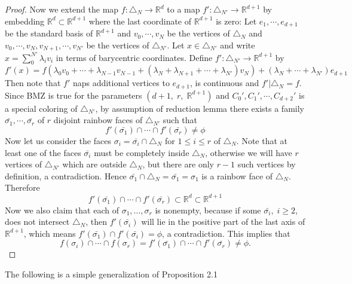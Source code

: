 \documentclass[11pt]{amsart}
\def\R{\mathbb R}
\def\t{\triangle}
\def\bn{\bigskip\noindent}
\begin{document}
\begin{proof}
\noindent Now we extend the map $f:\t_N \to \R^d$ to a map $f':\t_{N'}\to\R^{d+1}$ by embedding $\R^d\subset \R^{d+1}$ where the last coordinate of $\R^{d+1}$ is zero:  Let $e_1,\cdots , e_{d+1}$ be the standard basis of $\R^{d+1}$ and $v_0,\cdots , v_N$ be the vertices of $\t_N$ and $v_0,\cdots , v_N, v_{N+1},\cdots , v_{N'}$ be the vertices of $\t_{N'}$. Let $x\in\t_{N'}$ and write $x=\sum\limits^{N'}_{0}\lambda_iv_i$ in terms of barycentric coordinates. Define $f' : \t_{N'}\to\R^{d+1}$ by
$$f'(x)=f(\lambda_0v_0+\cdots +\lambda_{N-1} v_{N-1} +(\lambda_N+\lambda_{N+1}+\cdots + \lambda_{N'})v_N) +(\lambda_N+\cdots +\lambda_{N'})e_{d+1}   $$
Then note that $f'$ naps additional vertices to $e_{d+1}$, is continuous and $f'|\t_N=f$. Since BMZ is true for the parameters $(d+1,\;r,\;\R^{d+1})$ and $C_0',C_1',\cdots , C_{d+2}'  $ is a special coloring of $\t_{N'}$, by assumption of reduction lemma there exists a family $\bar{\sigma_1}, \cdots , \bar{\sigma_r}$ of $r$ disjoint rainbow faces of $\t_{N'}$ such that
$$f'(\bar{\sigma_1})\cap\cdots\cap f'(\bar{\sigma_r})\neq \phi$$
Now let us consider the faces $\sigma_i=\bar{\sigma_i}\cap\t_N$ for $1\leq i\leq r$ of $\t_{N}$.  Note that at least one of the faces $\bar{\sigma_i}$ must be completely inside $\t_N$, otherwise we will have $r$ vertices of $\t_{N'}$ which are outside $\t_N$, but there are only  $r-1$ such vertices by definition, a contradiction.
Hence $\bar{\sigma_1}\cap \t_N=\bar{\sigma_1}=\sigma_1$ is a rainbow face of $\t_N$. Therefore $$f'(\bar{\sigma_1})\cap\cdots\cap f'(\bar{\sigma_r})\subset\R^d\subset\R^{d+1}$$
Now we also claim that each of $\sigma_1,..., \sigma_r$ is nonempty, because if some $\bar{\sigma_i},\;i\geq 2$, does not intersect $\t_N$, then $f'(\bar{\sigma_i})$ will lie in the positive part of  the last axis of $\R^{d+1}$, which means $f'(\bar{\sigma_1})\cap f'(\bar{\sigma_i})=\phi$, a contradiction. This implies that
$$ f(\sigma_i)\cap\cdots\cap f(\sigma_r)=f'(\bar{\sigma_1})\cap\cdots\cap f'(\bar{\sigma_r}) \neq\phi.$$
\end{proof}


\bn The following is a simple generalization of Proposition 2.1
\end{document}
